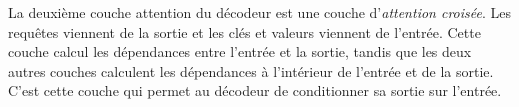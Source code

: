 La deuxième couche attention du décodeur est une couche d'\emph{attention croisée}.
Les requêtes viennent de la sortie et les clés et valeurs viennent de l'entrée.
Cette couche calcul les dépendances entre l'entrée et la sortie,
tandis que les deux autres couches calculent les dépendances à l'intérieur de l'entrée et de la sortie.
C'est cette couche qui permet au décodeur de conditionner sa sortie sur l'entrée.


